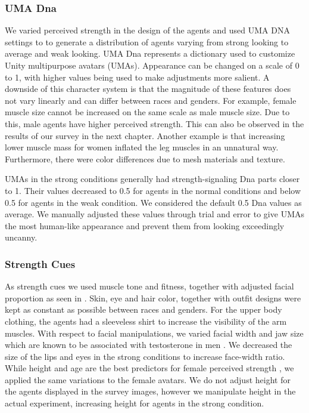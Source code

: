 \subsubsection{UMA Dna}
We varied perceived strength in the design of the agents and used UMA DNA settings to to generate a distribution of agents varying from strong looking to average and weak looking. UMA Dna represents a dictionary used to customize Unity multipurpose avatars (UMAs). Appearance can be changed on a scale of 0 to 1, with higher values being used to make adjustments more salient. A downside of this character system is that the magnitude of these features does not vary linearly and can differ between races and genders. For example, female muscle size cannot be increased on the same scale as male muscle size. Due to this, male agents have higher perceived strength. This can also be observed in the results of our survey in the next chapter. Another example is that increasing lower muscle mass for women inflated the leg muscles in an unnatural way. Furthermore, there were color differences due to mesh materials and texture. 

UMAs in the strong conditions generally had strength-signaling Dna parts closer to 1. Their values decreased to 0.5 for agents in the normal conditions and below 0.5 for agents in the weak condition. We considered the default 0.5 Dna values as average. We manually adjusted these values through trial and error to give UMAs the most human-like appearance and prevent them from looking exceedingly uncanny.    
\subsubsection{Strength Cues}
As strength cues we used muscle tone and fitness, together with adjusted facial proportion as seen in \cite{windhager2011geometric}. Skin, eye and hair color, together with outfit designs were kept as constant as possible between races and genders. For the upper body clothing, the agents had a sleeveless shirt to increase the visibility of the arm muscles. 
With respect to facial manipulations, we varied facial width and jaw size which are known to be associated with testosterone in men \cite{lefevre2013telling}. We decreased the size of the lips and eyes in the strong conditions to increase face-width ratio. While height and age are the best predictors for female perceived strength \cite{sell2008human}, we applied the same variations to the female avatars. We do not adjust height for the agents displayed in the survey images, however we manipulate height in the actual experiment, increasing height for agents in the strong condition.  

